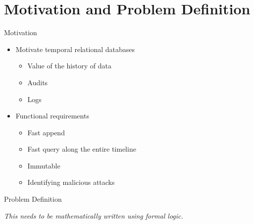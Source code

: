 \chapter{Motivation and Problem Definition}

Motivation

\begin{itemize}
    \item Motivate temporal relational databases
        \begin{itemize}
            \item Value of the history of data
            \item Audits
            \item Logs
        \end{itemize}
    \item Functional requirements
        \begin{itemize}
            \item Fast append
            \item Fast query along the entire timeline
            \item Immutable
            \item Identifying malicious attacks
        \end{itemize}
\end{itemize}

Problem Definition

{\it This needs to be mathematically written using formal logic.}
